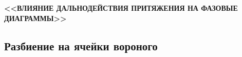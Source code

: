 \documentclass[pdf,hyperref={unicode}]{beamer}
\begin{document}



\begin{frame}
\begin{center}
\vspace{5mm}
\textbf{<<ВЛИЯНИЕ ДАЛЬНОДЕЙСТВИЯ ПРИТЯЖЕНИЯ НА ФАЗОВЫЕ ДИАГРАММЫ>>}
\end{center}
\end{frame}


\subsection{Разбиение на ячейки вороного}
\end{document}
